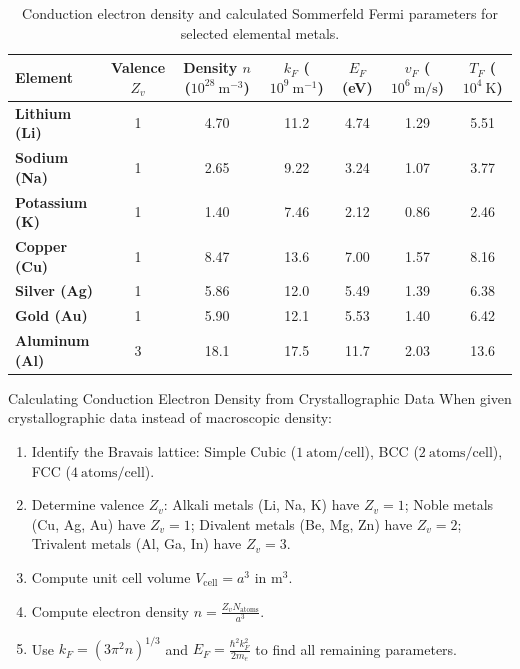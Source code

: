 \documentclass[11pt,a4paper]{article}
\begin{document}
\begin{table}[ht]
\centering
\small
\renewcommand{\arraystretch}{1.25}
\begin{tabular}{lcccccc}
\toprule
\textbf{Element} & \textbf{Valence} $Z_v$ & \textbf{Density} $n$ ($10^{28}\ \mathrm{m}^{-3}$) & $k_F$ ($10^9\ \mathrm{m}^{-1}$) & $E_F$ (eV) & $v_F$ ($10^6\ \mathrm{m/s}$) & $T_F$ ($10^4\ \mathrm{K}$) \\
\midrule
\textbf{Lithium (Li)}   & 1 & 4.70 & 11.2 & 4.74 & 1.29 & 5.51 \\
\textbf{Sodium (Na)}    & 1 & 2.65 & 9.22 & 3.24 & 1.07 & 3.77 \\
\textbf{Potassium (K)}  & 1 & 1.40 & 7.46 & 2.12 & 0.86 & 2.46 \\
\textbf{Copper (Cu)}    & 1 & 8.47 & 13.6 & 7.00 & 1.57 & 8.16 \\
\textbf{Silver (Ag)}    & 1 & 5.86 & 12.0 & 5.49 & 1.39 & 6.38 \\
\textbf{Gold (Au)}      & 1 & 5.90 & 12.1 & 5.53 & 1.40 & 6.42 \\
\textbf{Aluminum (Al)}  & 3 & 18.1 & 17.5 & 11.7 & 2.03 & 13.6 \\
\bottomrule
\end{tabular}
\caption{Conduction electron density and calculated Sommerfeld Fermi parameters for selected elemental metals.}
\label{tab:metal_fermi_params}
\end{table}

\begin{methodbox}{Calculating Conduction Electron Density from Crystallographic Data}
When given crystallographic data instead of macroscopic density:
\begin{enumerate}
    \item Identify the Bravais lattice: Simple Cubic ($1\ \text{atom/cell}$), BCC ($2\ \text{atoms/cell}$), FCC ($4\ \text{atoms/cell}$).
    \item Determine valence $Z_v$: Alkali metals (Li, Na, K) have $Z_v = 1$; Noble metals (Cu, Ag, Au) have $Z_v = 1$; Divalent metals (Be, Mg, Zn) have $Z_v = 2$; Trivalent metals (Al, Ga, In) have $Z_v = 3$.
    \item Compute unit cell volume $V_{\mathrm{cell}} = a^3$ in $\mathrm{m}^3$.
    \item Compute electron density $n = \frac{Z_v N_{\mathrm{atoms}}}{a^3}$.
    \item Use $k_F = (3\pi^2 n)^{1/3}$ and $E_F = \frac{\hbar^2 k_F^2}{2m_e}$ to find all remaining parameters.
\end{enumerate}
\end{methodbox}
\end{document}
